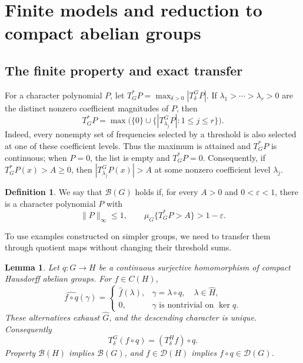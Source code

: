 \documentclass[11pt]{amsart}
\newtheorem{lemma}[theorem]{Lemma}
\theoremstyle{definition}
\newtheorem{definition}[theorem]{Definition}
\theoremstyle{remark}
\newcommand{\B}{\mathcal B}
\newcommand{\D}{\mathcal D}
\begin{document}
\section{Finite models and reduction to compact abelian groups}\label{sec:finite-models}

\subsection{The finite property and exact transfer}\label{sec:transfer}

For a character polynomial \(P\), let
\(T^*_GP=\max_{\delta>0}|T_\delta^GP|\).
If \(\lambda_1>\cdots>\lambda_r>0\) are the distinct nonzero
coefficient magnitudes of \(P\), then
\[
 T^*_GP=\max\bigl(\{0\}\cup
           \{|T_{\lambda_j}^GP|:1\leq j\leq r\}\bigr).
\]
Indeed, every nonempty set of frequencies selected by a threshold is
also selected at one of these coefficient levels. Thus the maximum is
attained and \(T^*_GP\) is continuous; when \(P=0\), the list is empty
and \(T^*_GP=0\). Consequently, if \(T^*_GP(x)>A\geq0\), then
\(|T_{\lambda_j}^GP(x)|>A\) at some nonzero coefficient level
\(\lambda_j\).

\begin{definition}
We say that \(\B(G)\) holds if, for every \(A>0\) and
\(0<\varepsilon<1\), there is a character polynomial \(P\) with
\[
 \|P\|_\infty\leq1,\qquad
 \mu_G\{T^*_GP>A\}>1-\varepsilon.
\]
\end{definition}

To use examples constructed on simpler groups, we need to transfer them
through quotient maps without changing their threshold sums.

\begin{lemma}\label{main:quotient}
Let \(q:G\to H\) be a continuous surjective homomorphism of compact
Hausdorff abelian groups. For \(f\in C(H)\),
\[
 \widehat{f\circ q}(\gamma)=
 \begin{cases}
 \widehat f(\lambda),&\gamma=\lambda\circ q,\quad\lambda\in\widehat H,\\
 0,&\gamma\text{ is nontrivial on }\ker q.
 \end{cases}
\]
These alternatives exhaust \(\widehat G\), and the descending
character is unique. Consequently
\[
 T_\delta^G(f\circ q)=(T_\delta^Hf)\circ q.
\]
Property \(\B(H)\) implies \(\B(G)\), and \(f\in\D(H)\) implies
\(f\circ q\in\D(G)\).
\end{lemma}
\end{document}
